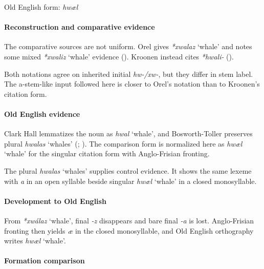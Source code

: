 \documentclass[
  british,
  a4paper,
]{article}
\providecommand{\Recon}[1]{\emph{*#1}}
\begin{document}
Old English form: \emph{hwæl}

\paragraph{Reconstruction and comparative
evidence}\label{reconstruction-and-comparative-evidence-120}

The comparative sources are not uniform. Orel gives \Recon{xwalaz}
`whale' and notes some mixed \Recon{xwaliz} `whale' evidence
(). Kroonen instead cites
{\emph{*hwali-}} ().

Both notations agree on inherited initial \emph{hw-/xw-}, but they
differ in stem label. The a-stem-like input followed here is closer to
Orel's notation than to Kroonen's citation form.

\paragraph{Old English evidence}\label{old-english-evidence-122}

Clark Hall lemmatizes the noun as {\emph{hwal}} `whale', and
Bosworth-Toller preserves plural {\emph{hwalas}} `whales'
(;
). The
comparison form is normalized here as {\emph{hwæl}} `whale' for the
singular citation form with Anglo-Frisian fronting.

The plural {\emph{hwalas}} `whales' supplies control evidence. It shows
the same lexeme with \emph{a} in an open syllable beside singular
{\emph{hwæl}} `whale' in a closed monosyllable.

\paragraph{Development to Old
English}\label{development-to-old-english-120}

From \Recon{xwálaz} `whale', final \emph{-z} disappears and bare final
\emph{-a} is lost. Anglo-Frisian fronting then yields \emph{æ} in the
closed monosyllable, and Old English orthography writes {\emph{hwæl}}
`whale'.

\paragraph{Formation comparison}\label{formation-comparison-6}
\end{document}
